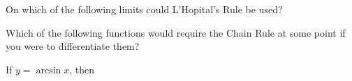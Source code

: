 \documentclass[addpoints]{exam}
\begin{document}
\begin{questions}
\question[2] On which of the following limits could L'Hopital's Rule be used? 

\question[2] Which of the following functions would require the Chain Rule at some point if you were to differentiate them? 

\question[2] If $y = \arcsin x$, then 
\end{questions}
\end{document}
